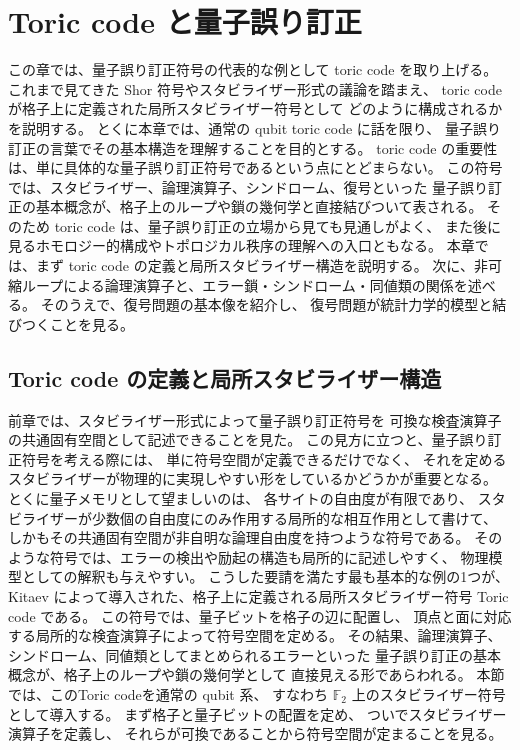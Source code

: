 \documentclass[../master.tex]{subfiles}
\begin{document}
\chapter{Toric code と量子誤り訂正}
この章では、量子誤り訂正符号の代表的な例として toric code を取り上げる。
これまで見てきた Shor 符号やスタビライザー形式の議論を踏まえ、
toric code が格子上に定義された局所スタビライザー符号として
どのように構成されるかを説明する。
とくに本章では、通常の qubit toric code に話を限り、
量子誤り訂正の言葉でその基本構造を理解することを目的とする。
toric code の重要性は、単に具体的な量子誤り訂正符号であるという点にとどまらない。
この符号では、スタビライザー、論理演算子、シンドローム、復号といった
量子誤り訂正の基本概念が、格子上のループや鎖の幾何学と直接結びついて表される。
そのため toric code は、量子誤り訂正の立場から見ても見通しがよく、
また後に見るホモロジー的構成やトポロジカル秩序の理解への入口ともなる。
本章では、まず toric code の定義と局所スタビライザー構造を説明する。
次に、非可縮ループによる論理演算子と、エラー鎖・シンドローム・同値類の関係を述べる。
そのうえで、復号問題の基本像を紹介し、
復号問題が統計力学的模型と結びつくことを見る。

\section{Toric code の定義と局所スタビライザー構造}
前章では、スタビライザー形式によって量子誤り訂正符号を
可換な検査演算子の共通固有空間として記述できることを見た。
この見方に立つと、量子誤り訂正符号を考える際には、
単に符号空間が定義できるだけでなく、
それを定めるスタビライザーが物理的に実現しやすい形をしているかどうかが重要となる。
とくに量子メモリとして望ましいのは、
各サイトの自由度が有限であり、
スタビライザーが少数個の自由度にのみ作用する局所的な相互作用として書けて、
しかもその共通固有空間が非自明な論理自由度を持つような符号である。
そのような符号では、エラーの検出や励起の構造も局所的に記述しやすく、
物理模型としての解釈も与えやすい。
こうした要請を満たす最も基本的な例の1つが、
Kitaev によって導入された、格子上に定義される局所スタビライザー符号
Toric code \cite{Kitaev2003-uj,Dennis2002-dl}である。
この符号では、量子ビットを格子の辺に配置し、
頂点と面に対応する局所的な検査演算子によって符号空間を定める。
その結果、論理演算子、シンドローム、同値類としてまとめられるエラーといった
量子誤り訂正の基本概念が、格子上のループや鎖の幾何学として
直接見える形であらわれる。
本節では、このToric codeを通常の qubit 系、
すなわち \(\mathbb{F}_2\) 上のスタビライザー符号として導入する。
まず格子と量子ビットの配置を定め、
ついでスタビライザー演算子を定義し、
それらが可換であることから符号空間が定まることを見る。
\end{document}
